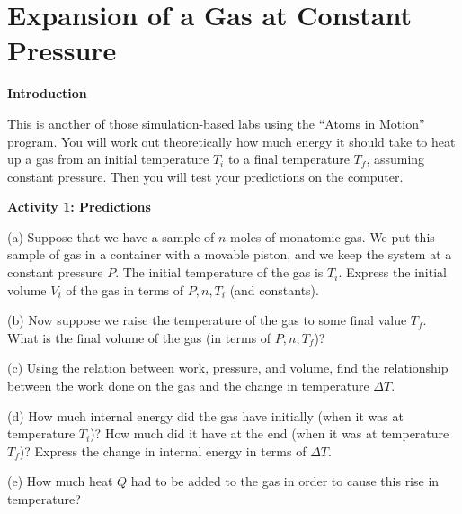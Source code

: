 \section{Expansion of a Gas at Constant Pressure}
\begin{comment}
This lab was written by Ted Bunn for spring of 2016.  It was edited slightly by Matt Trawick for this manual in April 2016.

\end{comment}

\makelabheader %

\bigskip

\textbf{Introduction}

This is another of those simulation-based labs using the ``Atoms in
Motion'' program.  You will work out theoretically how much energy it
should take to heat up a gas from an initial temperature $T_i$
to a final temperature $T_f$, assuming constant pressure.  Then you will
test your predictions on the computer.

\bigskip

\textbf{Activity 1: Predictions}

(a) Suppose that we have a sample of $n$ moles of monatomic gas.
We put this sample of gas in a container with a movable
piston, and we keep the system at a constant pressure $P$.  The initial
temperature of the gas is $T_i$.  Express the initial volume $V_i$ of 
the gas in terms of $P,n,T_i$ (and constants).  

\answerspace{0.8in}

(b) Now suppose we raise the temperature of the gas to some final value
$T_f$.  What is the final volume of the gas (in terms of $P,n,T_f$)?

\answerspace{0.8in}

(c) Using the relation between work, pressure, and volume, find
the relationship between the work done on the gas and the change in temperature
$\Delta T$.

\answerspace{1in}%

(d) How much internal energy did the gas have initially (when it
was at temperature $T_i$)?  How much did it have at the end (when
it was at temperature $T_f$)?  Express the change in internal energy
in terms of $\Delta T$.

\answerspace{1.1in}%

(e) How much heat $Q$ had to be added to the gas in order to cause
this rise in temperature?  

